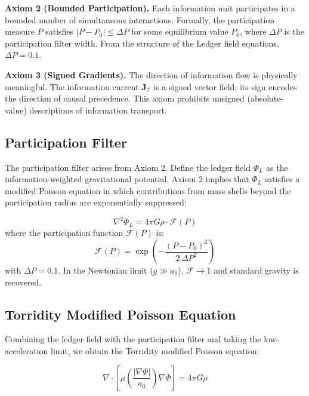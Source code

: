 \documentclass[aps,prl,twocolumn,superscriptaddress,nofootinbib]{revtex4-2}
\begin{document}
\textbf{Axiom 2 (Bounded Participation).} Each information unit participates in a bounded number of simultaneous interactions. Formally, the participation measure $P$ satisfies $|P - P_0| \leq \Delta P$ for some equilibrium value $P_0$, where $\Delta P$ is the participation filter width. From the structure of the Ledger field equations, $\Delta P = 0.1$.

\textbf{Axiom 3 (Signed Gradients).} The direction of information flow is physically meaningful. The information current $\mathbf{J}_\mathcal{I}$ is a signed vector field; its sign encodes the direction of causal precedence. This axiom prohibits unsigned (absolute-value) descriptions of information transport.

\subsection{Participation Filter}

The participation filter arises from Axiom 2. Define the ledger field $\Phi_L$ as the information-weighted gravitational potential. Axiom 2 implies that $\Phi_L$ satisfies a modified Poisson equation in which contributions from mass shells beyond the participation radius are exponentially suppressed:

\begin{equation}
    \nabla^2 \Phi_L = 4\pi G \rho \cdot \mathcal{F}(P)
\end{equation}
where the participation function $\mathcal{F}(P)$ is:
\begin{equation}
    \mathcal{F}(P) = \exp\!\left(-\frac{(P - P_0)^2}{2\,\Delta P^2}\right)
\end{equation}
with $\Delta P = 0.1$. In the Newtonian limit ($g \gg a_0$), $\mathcal{F} \to 1$ and standard gravity is recovered.

\subsection{Torridity Modified Poisson Equation}

Combining the ledger field with the participation filter and taking the low-acceleration limit, we obtain the Torridity modified Poisson equation:

\begin{equation}
    \nabla \cdot \left[ \mu\!\left(\frac{|\nabla\Phi|}{a_0}\right) \nabla\Phi \right] = 4\pi G \rho
    \label{eq:torridity_poisson}
\end{equation}
\end{document}
